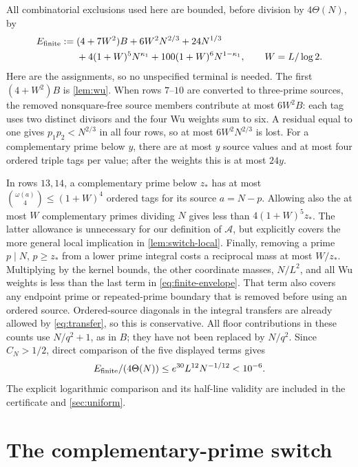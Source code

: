 \documentclass[11pt]{article}
\theoremstyle{definition}
\newcommand{\A}{\mathcal A}
\newcommand{\Th}{\Theta(N)}
\begin{document}
All combinatorial exclusions used here are bounded, before division
by $4\Th$, by
\begin{equation}\label{eq:finite-envelope}
\begin{split}
 E_{\rm finite}:={}&(4+7W^2)B+6W^2N^{2/3}+24N^{1/3}\\
 &+4(1+W)^5N^{\kappa_1}
              +100(1+W)^6N^{1-\kappa_1},
 \qquad W=L/\log2.
\end{split}
\end{equation}
Here are the assignments, so no unspecified terminal is needed.
The first $(4+W^2)B$ is \cref{lem:wu}.  When rows $7$--$10$ are
converted to three-prime sources, the removed nonsquare-free source
members contribute at most $6W^2B$: each tag uses two distinct divisors
and the four Wu weights sum to six.  A residual equal to one gives
$p_1p_2<N^{2/3}$ in all four rows, so at most $6W^2N^{2/3}$ is lost.
For a complementary prime below $y$, there are at most $y$ source
values and at most four ordered triple tags per value; after the
weights this is at most $24y$.

In rows $13,14$, a complementary prime below $z_*$ has at most
$\binom{\omega(a)}4\le(1+W)^4$ ordered tags for its source
$a=N-p$.  Allowing also the at most $W$ complementary primes dividing
$N$ gives less than $4(1+W)^5z_*$.  The latter allowance is unnecessary
for our definition of $\A$, but explicitly covers the more general
local implication in \cref{lem:switch-local}.
Finally, removing a prime $p\mid N$, $p\ge z_*$ from a lower prime
integral costs a reciprocal mass at most $W/z_*$.  Multiplying by
the kernel bounds, the other coordinate masses, $N/L^2$, and all
Wu weights is less than the last term in \eqref{eq:finite-envelope}.
That term also covers any endpoint prime or repeated-prime boundary
that is removed before using an ordered source.  Ordered-source
diagonals in the integral transfers are already allowed by
\eqref{eq:transfer}, so this is conservative.
All floor contributions in these counts use $N/q^2+1$, as in $B$;
they have not been replaced by $N/q^2$.
Since $C_N>1/2$, direct comparison of the five displayed terms gives
\begin{equation}\label{eq:finite-cost}
 E_{\rm finite}/(4\Th)\le e^{30}L^{12}N^{-1/12}<10^{-6}.
\end{equation}
The explicit logarithmic comparison and its half-line validity are
included in the certificate and \cref{sec:uniform}.

\section{The complementary-prime switch}\label{sec:switch}
\end{document}
